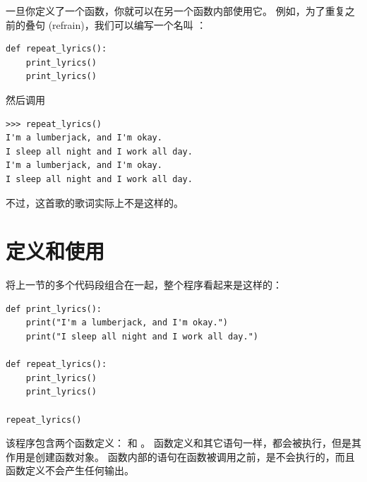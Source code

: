 一旦你定义了一个函数，你就可以在另一个函数内部使用它。
例如，为了重复之前的叠句 (refrain)，我们可以编写一个名叫  ：


\begin{lstlisting}
def repeat_lyrics():
    print_lyrics()
    print_lyrics()
\end{lstlisting}

%

然后调用 


\begin{lstlisting}
>>> repeat_lyrics()
I'm a lumberjack, and I'm okay.
I sleep all night and I work all day.
I'm a lumberjack, and I'm okay.
I sleep all night and I work all day.
\end{lstlisting}

%

不过，这首歌的歌词实际上不是这样的。


%
\section{定义和使用}


将上一节的多个代码段组合在一起，整个程序看起来是这样的：

\begin{lstlisting}
def print_lyrics():
    print("I'm a lumberjack, and I'm okay.")
    print("I sleep all night and I work all day.")

def repeat_lyrics():
    print_lyrics()
    print_lyrics()

repeat_lyrics()
\end{lstlisting}

%

该程序包含两个函数定义： 和 。
函数定义和其它语句一样，都会被执行，但是其作用是创建函数对象。
函数内部的语句在函数被调用之前，是不会执行的，而且函数定义不会产生任何输出。

